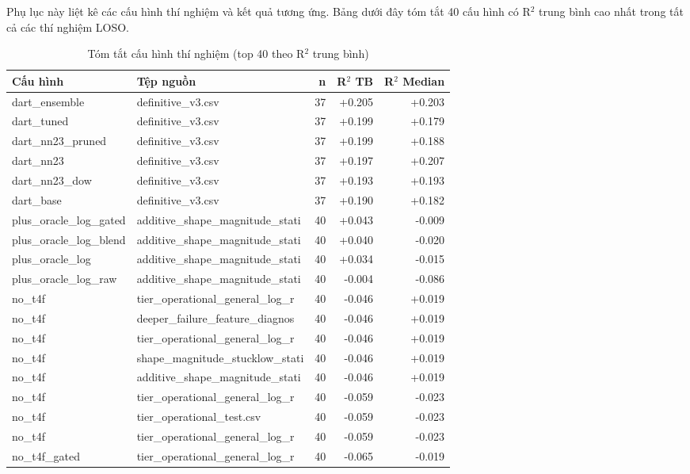 \documentclass[../DoAn.tex]{subfiles}
\begin{document}
Phụ lục này liệt kê các cấu hình thí nghiệm và kết quả tương ứng. Bảng dưới đây tóm tắt 40 cấu hình có R$^2$ trung bình cao nhất trong tất cả các thí nghiệm LOSO.

{\small
\begin{longtable}{p{3.5cm}p{3.5cm}rr r}
\caption{Tóm tắt cấu hình thí nghiệm (top 40 theo R$^2$ trung bình)}\\
\toprule
\textbf{Cấu hình} & \textbf{Tệp nguồn} & \textbf{n} & \textbf{R$^2$ TB} & \textbf{R$^2$ Median} \\
\midrule\endhead
  dart\_ensemble & definitive\_v3.csv & 37 & +0.205 & +0.203 \\
  dart\_tuned & definitive\_v3.csv & 37 & +0.199 & +0.179 \\
  dart\_nn23\_pruned & definitive\_v3.csv & 37 & +0.199 & +0.188 \\
  dart\_nn23 & definitive\_v3.csv & 37 & +0.197 & +0.207 \\
  dart\_nn23\_dow & definitive\_v3.csv & 37 & +0.193 & +0.193 \\
  dart\_base & definitive\_v3.csv & 37 & +0.190 & +0.182 \\
  plus\_oracle\_log\_gated & additive\_shape\_magnitude\_stati & 40 & +0.043 & -0.009 \\
  plus\_oracle\_log\_blend & additive\_shape\_magnitude\_stati & 40 & +0.040 & -0.020 \\
  plus\_oracle\_log & additive\_shape\_magnitude\_stati & 40 & +0.034 & -0.015 \\
  plus\_oracle\_log\_raw & additive\_shape\_magnitude\_stati & 40 & -0.004 & -0.086 \\
  no\_t4f & tier\_operational\_general\_log\_r & 40 & -0.046 & +0.019 \\
  no\_t4f & deeper\_failure\_feature\_diagnos & 40 & -0.046 & +0.019 \\
  no\_t4f & tier\_operational\_general\_log\_r & 40 & -0.046 & +0.019 \\
  no\_t4f & shape\_magnitude\_stucklow\_stati & 40 & -0.046 & +0.019 \\
  no\_t4f & additive\_shape\_magnitude\_stati & 40 & -0.046 & +0.019 \\
  no\_t4f & tier\_operational\_general\_log\_r & 40 & -0.059 & -0.023 \\
  no\_t4f & tier\_operational\_test.csv & 40 & -0.059 & -0.023 \\
  no\_t4f & tier\_operational\_general\_log\_r & 40 & -0.059 & -0.023 \\
  no\_t4f\_gated & tier\_operational\_general\_log\_r & 40 & -0.065 & -0.019 \\

\end{longtable}}
\end{document}
